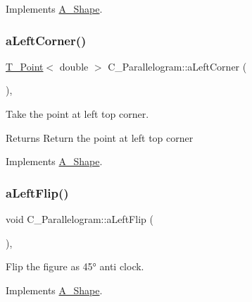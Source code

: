 Implements \hyperlink{classA__Shape_a63f825cbc9780208d9a137f5c14917d0}{A\+\_\+\+Shape}.

\mbox{\label{classC__Parallelogram_a260c557810c63dd97f2dd64bc15b9dc8}} 
\subsubsection{\texorpdfstring{a\+Left\+Corner()}{aLeftCorner()}}
{\footnotesize\ttfamily \hyperlink{classT__Point}{T\+\_\+\+Point}$<$ double $>$ C\+\_\+\+Parallelogram\+::a\+Left\+Corner (\begin{DoxyParamCaption}{ }\end{DoxyParamCaption})\hspace{0.3cm}{\ttfamily [override]}, {\ttfamily [virtual]}}



Take the point at left top corner. 

\begin{DoxyReturn}{Returns}
Return the point at left top corner 
\end{DoxyReturn}


Implements \hyperlink{classA__Shape_abe6781b13037bf7ecea8ff9456b31533}{A\+\_\+\+Shape}.

\mbox{\label{classC__Parallelogram_a284a59c9f1c778ac8da80efedc313354}} 
\subsubsection{\texorpdfstring{a\+Left\+Flip()}{aLeftFlip()}}
{\footnotesize\ttfamily void C\+\_\+\+Parallelogram\+::a\+Left\+Flip (\begin{DoxyParamCaption}{ }\end{DoxyParamCaption})\hspace{0.3cm}{\ttfamily [override]}, {\ttfamily [virtual]}}



Flip the figure as 45° anti clock. 



Implements \hyperlink{classA__Shape_abe947e7003cb63be2b4f6c439533427d}{A\+\_\+\+Shape}.

